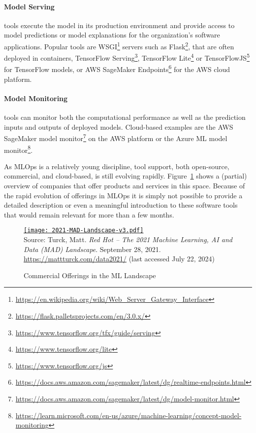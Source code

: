 \paragraph*{Model Serving} tools execute the model in its production environment and provide access to model predictions or model explanations for the organization's software applications. Popular tools are WSGI\footnote{\url{https://en.wikipedia.org/wiki/Web_Server_Gateway_Interface}} servers such as Flask\footnote{\url{https://flask.palletsprojects.com/en/3.0.x/}}, that are often deployed in containers, TensorFlow Serving\footnote{\url{https://www.tensorflow.org/tfx/guide/serving}}, TensorFlow Lite\footnote{\url{https://www.tensorflow.org/lite}} or TensorFlowJS\footnote{\url{https://www.tensorflow.org/js}} for TensorFlow models, or AWS SageMaker Endpoints\footnote{\url{https://docs.aws.amazon.com/sagemaker/latest/dg/realtime-endpoints.html}} for the AWS cloud platform. 

\paragraph*{Model Monitoring} tools can monitor both the computational performance as well as the prediction inputs and outputs of deployed models. Cloud-based examples are the AWS SageMaker model monitor\footnote{\url{https://docs.aws.amazon.com/sagemaker/latest/dg/model-monitor.html}} on the AWS platform or the Azure ML model monitor\footnote{\url{https://learn.microsoft.com/en-us/azure/machine-learning/concept-model-monitoring}}. 

As MLOps is a relatively young discipline, tool support, both open-source, commercial, and cloud-based, is still evolving rapidly. Figure~\ref{fig:mlopstooling} shows a (partial) overview of companies that offer products and services in this space. Because of the rapid evolution of offerings in MLOps it is simply not possible to provide a detailed description or even a meaningful introduction to these software tools that would remain relevant for more than a few months. 

\begin{figure}
\href{https://mattturck.com/wp-content/uploads/2021/12/2021-MAD-Landscape-v3.pdf}{
\texttt{[image: 2021-MAD-Landscape-v3.pdf]}} \\

\scriptsize Source: Turck, Matt. \textit{Red Hot -- The 2021 Machine Learning, AI and Data (MAD) Landscape}. September 28, 2021. \url{https://mattturck.com/data2021/} (last accessed July 22, 2024)
\caption{Commercial Offerings in the ML Landscape}
\label{fig:mlopstooling}
\end{figure}

